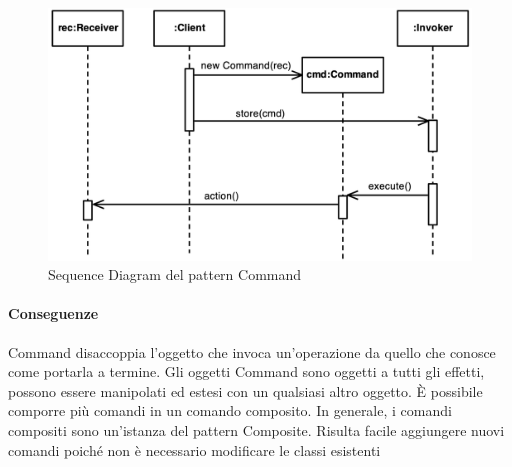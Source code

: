 \begin{figure}[H]
    \centering
    \includegraphics[width=0.75\linewidth]{assets/pattern/command/command-sequence.png}
    \caption{Sequence Diagram del pattern Command}
\end{figure}

\paragraph{Conseguenze} Command disaccoppia l’oggetto che invoca un’operazione da quello che conosce come portarla a termine.
Gli oggetti Command sono oggetti a tutti gli effetti, possono essere manipolati ed estesi con un qualsiasi altro oggetto.
È possibile comporre più comandi in un comando composito.
In generale, i comandi compositi sono un’istanza del pattern Composite.
Risulta facile aggiungere nuovi comandi poiché non è necessario modificare le classi esistenti


\newpage